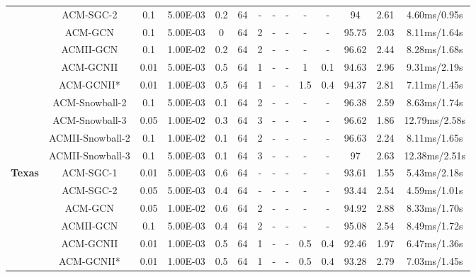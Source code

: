 \documentclass{article}
\newcommand{\0}{{\boldsymbol{0}}}
\newcommand{\6}{{\partial}}
\newcommand{\8}{{\infty}}
\newcommand{\4}{{\nabla}}
\begin{document}
\begin{table}[htbp]
{\begin{tabular}{c|c|cccccccccccc}
          & ACM-SGC-2 & 0.1   & 5.00E-03 & 0.2   & 64    & -     & -     & -     & -     & -     & 94    & 2.61  & 4.60ms/0.95s \\
          & ACM-GCN & 0.1   & 5.00E-03 & 0     & 64    & 2     & -     & -     & -     & -     & 95.75 & 2.03  & {8.11ms/1.64s} \\
          & ACMII-GCN & 0.1   & 1.00E-02 & 0.2   & 64    & 2     & -     & -     & -     & -     & 96.62 & 2.44  & 8.28ms/1.68s \\
          & ACM-GCNII & 0.01  & 5.00E-03 & 0.5   & 64    & 1     & -     & -     & 1     & 0.1   & 94.63 & 2.96  & 9.31ms/2.19s \\
          & ACM-GCNII* & 0.01  & 1.00E-03 & 0.5   & 64    & 1     & -     & -     & 1.5   & 0.4   & 94.37 & 2.81  & 7.11ms/1.45s \\
          & ACM-Snowball-2 & 0.1   & 5.00E-03 & 0.1   & 64    & 2     & -     & -     & -     & -     & 96.38 & 2.59  &  8.63ms/1.74s \\
          & ACM-Snowball-3 & 0.05  & 1.00E-02 & 0.3   & 64    & 3     & -     & -     & -     & -     & 96.62 & 1.86  & 12.79ms/2.58s \\
          & ACMII-Snowball-2 & 0.1   & 1.00E-02 & 0.1   & 64    & 2     & -     & -     & -     & -     & {96.63} & 2.24  & 8.11ms/1.65s \\
          & ACMII-Snowball-3 & 0.1   & 5.00E-03 & 0.1   & 64    & 3     & -     & -     & -     & -     & 97    & 2.63  & 12.38ms/2.51s \\
          \midrule
    \multirow{10}[0]{*}{\textbf{Texas}} & ACM-SGC-1 & 0.01  & 5.00E-03 & 0.6   & 64    & -     & -     & -     & -     & -     & 93.61 & 1.55  & 5.43ms/2.18s \\
          & ACM-SGC-2 & 0.05  & 5.00E-03 & 0.4   & 64    & -     & -     & -     & -     & -     & 93.44 & 2.54  & 4.59ms/1.01s \\
          & ACM-GCN & 0.05  & 1.00E-02 & 0.6   & 64    & 2     & -     & -     & -     & -     & 94.92 & 2.88  & 8.33ms/1.70s \\
          & ACMII-GCN & 0.1   & 5.00E-03 & 0.4   & 64    & 2     & -     & -     & -     & -     & 95.08 & 2.54  & 8.49ms/1.72s \\
          & ACM-GCNII & 0.01  & 1.00E-03 & 0.5   & 64    & 1     & -     & -     & 0.5   & 0.4   & 92.46 & 1.97  & 6.47ms/1.36s \\
          & ACM-GCNII* & 0.01  & 1.00E-03 & 0.5   & 64    & 1     & -     & -     & 0.5   & 0.4   & 93.28 & 2.79  & 7.03ms/1.45s \\

\end{tabular}}
\end{table}
\end{document}
